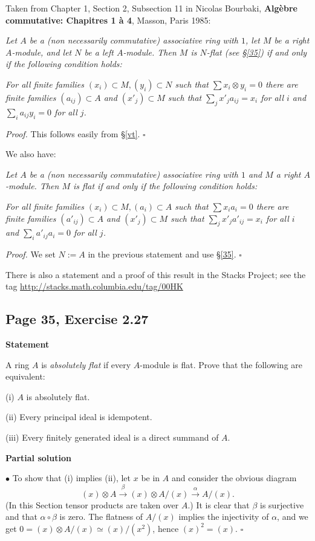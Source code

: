 \documentclass[parskip=half,fontsize=12pt]{scrartcl}%
\newcommand{\bu}{\bullet}
\newcommand{\xr}{\xrightarrow}
\begin{document}
Taken from Chapter 1, Section 2, Subsection 11 in Nicolas Bourbaki, \textbf{Algèbre commutative: Chapitres 1 à 4}, Masson, Paris 1985:

\emph{Let $A$ be a (non necessarily commutative) associative ring with $1$, let $M$ be a right $A$-module, and let $N$ be a left $A$-module. Then $M$ is $N$-flat (see \S\ref{35}) if and only if the following condition holds:}

\emph{For all finite families $(x_i)\subset M,(y_i)\subset N$ such that $\sum x_i\otimes y_i=0$ there are finite families $(a_{ij})\subset A$ and $(x'_j)\subset M$ such that $\sum_jx'_ja_{ij}=x_i$ for all $i$ and $\sum_ia_{ij}y_i=0$ for all $j$.}

\emph{Proof.} This follows easily from \S\ref{vt}. $\square$

We also have:

\emph{Let $A$ be a (non necessarily commutative) associative ring with $1$ and $M$ a right $A$-module. Then $M$ is flat if and only if the following condition holds:}

\emph{For all finite families $(x_i)\subset M,(a_i)\subset A$ such that $\sum x_ia_i=0$ there are finite families $(a'_{ij})\subset A$ and $(x'_j)\subset M$ such that $\sum_jx'_ja'_{ij}=x_i$ for all $i$ and $\sum_ia'_{ij}a_i=0$ for all $j$.}

\emph{Proof.} We set $N:=A$ in the previous statement and use \S\ref{35}. $\square$

There is also a statement and a proof of this result in the Stacks Project; see the tag \href{http://stacks.math.columbia.edu/tag/00HK}{http://stacks.math.columbia.edu/tag/00HK}

\subsection{Page 35, Exercise 2.27}\label{227}%

\textbf{Statement}

A ring $A$ is \emph{absolutely flat} if every $A$-module is flat. Prove that the following are equivalent:

(i) $A$ is absolutely flat.

(ii) Every principal ideal is idempotent.

(iii) Every finitely generated ideal is a direct summand of $A$. 

\textbf{Partial solution}

$\bu$ To show that (i) implies (ii), let $x$ be in $A$ and consider the obvious diagram 
$$
(x)\otimes A\xr\beta(x)\otimes A/(x)\xr\alpha A/(x). 
$$ 
(In this Section tensor products are taken over $A$.) It is clear that $\beta$ is surjective and that $\alpha\circ\beta$ is zero. The flatness of $A/(x)$ implies the injectivity of $\alpha$, and we get $0=(x)\otimes A/(x)\simeq(x)/(x^2)$, hence $(x)^2=(x)$. $\square$
\end{document}
